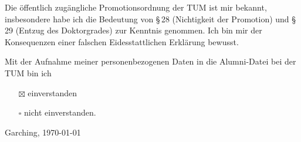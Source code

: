   Die \"{o}ffentlich zug\"{a}ngliche Promotionsordnung der TUM ist mir bekannt, insbesondere habe ich die Bedeutung von \S\,28 (Nichtigkeit der Promotion) und \S\,29 (Entzug des Doktorgrades) zur Kenntnis genommen.
  Ich bin mir der Konsequenzen einer falschen Eidesstattlichen Erkl\"{a}rung bewusst.
  
  Mit der Aufnahme meiner personenbezogenen Daten in die Alumni-Datei bei der TUM bin ich
  \begin{itemize}
    \renewcommand*\labelitemi{$\square$}%
    \setlength{\itemsep}{0.2\itemsep}%
    \item[$\boxtimes$] einverstanden
    \item[$\square$] nicht einverstanden.
  \end{itemize}
  \vfill
  Garching, \today\hfill%


